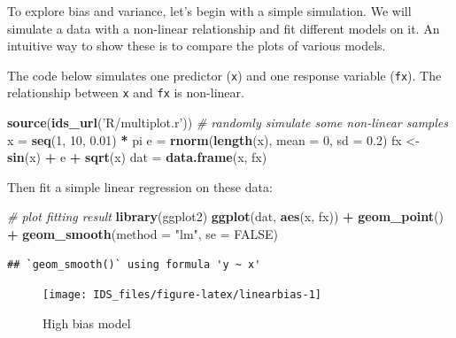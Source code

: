 \documentclass[12pt,]{krantz}
\makeatletter
\newenvironment{Shaded}{\begin{snugshade}}{\end{snugshade}}
\newcommand{\CommentTok}[1]{\textcolor[rgb]{0.37,0.37,0.37}{\textit{#1}}}
\newcommand{\DataTypeTok}[1]{\textcolor[rgb]{0.27,0.27,0.27}{#1}}
\newcommand{\DecValTok}[1]{\textcolor[rgb]{0.06,0.06,0.06}{#1}}
\newcommand{\FloatTok}[1]{\textcolor[rgb]{0.06,0.06,0.06}{#1}}
\newcommand{\KeywordTok}[1]{\textcolor[rgb]{0.27,0.27,0.27}{\textbf{#1}}}
\newcommand{\NormalTok}[1]{#1}
\newcommand{\OperatorTok}[1]{\textcolor[rgb]{0.43,0.43,0.43}{\textbf{#1}}}
\newcommand{\OtherTok}[1]{\textcolor[rgb]{0.37,0.37,0.37}{#1}}
\newcommand{\StringTok}[1]{\textcolor[rgb]{0.5,0.5,0.5}{#1}}
\newenvironment{kframe}{%
\medskip{}
\setlength{\fboxsep}{.8em}
 \def\at@end@of@kframe{}%
 \ifinner\ifhmode%
  \def\at@end@of@kframe{\end{minipage}}%
  \begin{minipage}{\columnwidth}%
 \fi\fi%
 \def\FrameCommand##1{\hskip\@totalleftmargin \hskip-\fboxsep
 \colorbox{shadecolor}{##1}\hskip-\fboxsep
     \hskip-\linewidth \hskip-\@totalleftmargin \hskip\columnwidth}%
 \MakeFramed {\advance\hsize-\width
   \@totalleftmargin\z@ \linewidth\hsize
   \@setminipage}}%
 {\par\unskip\endMakeFramed%
 \at@end@of@kframe}
\renewenvironment{Shaded}{\begin{kframe}}{\end{kframe}}
\makeatother
\begin{document}
To explore bias and variance, let's begin with a simple simulation. We will simulate a data with a non-linear relationship and fit different models on it. An intuitive way to show these is to compare the plots of various models.

The code below simulates one predictor (\texttt{x}) and one response variable (\texttt{fx}). The relationship between \texttt{x} and \texttt{fx} is non-linear.

\begin{Shaded}
\begin{Highlighting}[]
\KeywordTok{source}\NormalTok{(}\KeywordTok{ids_url}\NormalTok{(}\StringTok{'R/multiplot.r'}\NormalTok{))}
\CommentTok{# randomly simulate some non-linear samples}
\NormalTok{x =}\StringTok{ }\KeywordTok{seq}\NormalTok{(}\DecValTok{1}\NormalTok{, }\DecValTok{10}\NormalTok{, }\FloatTok{0.01}\NormalTok{) }\OperatorTok{*}\StringTok{ }\NormalTok{pi}
\NormalTok{e =}\StringTok{ }\KeywordTok{rnorm}\NormalTok{(}\KeywordTok{length}\NormalTok{(x), }\DataTypeTok{mean =} \DecValTok{0}\NormalTok{, }\DataTypeTok{sd =} \FloatTok{0.2}\NormalTok{)}
\NormalTok{fx <-}\StringTok{ }\KeywordTok{sin}\NormalTok{(x) }\OperatorTok{+}\StringTok{ }\NormalTok{e }\OperatorTok{+}\StringTok{ }\KeywordTok{sqrt}\NormalTok{(x)}
\NormalTok{dat =}\StringTok{ }\KeywordTok{data.frame}\NormalTok{(x, fx)}
\end{Highlighting}
\end{Shaded}

Then fit a simple linear regression on these data:

\begin{Shaded}
\begin{Highlighting}[]
\CommentTok{# plot fitting result}
\KeywordTok{library}\NormalTok{(ggplot2)}
\KeywordTok{ggplot}\NormalTok{(dat, }\KeywordTok{aes}\NormalTok{(x, fx)) }\OperatorTok{+}\StringTok{ }
\StringTok{    }\KeywordTok{geom_point}\NormalTok{() }\OperatorTok{+}\StringTok{ }
\StringTok{    }\KeywordTok{geom_smooth}\NormalTok{(}\DataTypeTok{method =} \StringTok{"lm"}\NormalTok{, }\DataTypeTok{se =} \OtherTok{FALSE}\NormalTok{)}
\end{Highlighting}
\end{Shaded}

\begin{verbatim}
## `geom_smooth()` using formula 'y ~ x'
\end{verbatim}

\begin{figure}

{\centering \texttt{[image: IDS\_files/figure-latex/linearbias-1]} 

}

\caption{High bias model}\label{fig:linearbias}
\end{figure}
\end{document}
